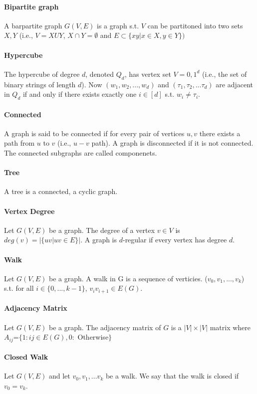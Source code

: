 \documentclass{article}
\begin{document}
\paragraph{Bipartite graph} A barpartite graph $G(V,E)$ is a graph s.t. $V$ can be partitoned into two sets $X, Y$ (i.e., $V=XUY$, $X\cap Y= \emptyset$ and $E\subset \{xy|x\in X, y \in  Y\})$
\paragraph{Hypercube} The hypercube of degree $d$, denoted $Q_d$, has vertex set $V = {0,1}^d$ (i.e., the set of binary strings of length $d$). Now $(w_1, w_2, ..., w_d)$ and $(\tau_1, \tau_2,...\tau_d)$ are adjacent in $Q_d$ if and only if there exists exactly one $i \in [d]$ s.t. $w_i \neq \tau_i$.
\paragraph{Connected} A graph is said to be connected if for every pair of vertices $u,v$ there exists a path from $u$ to $v$ (i.e., $u-v$ path). A graph is disconnected if it is not connected. The connected subgraphs are called componenets.
\paragraph{Tree} A tree is a connected, a cyclic graph.
\paragraph{Vertex Degree}Let $G(V, E)$ be a graph. The degree of a vertex $v \in V$ is $deg(v)= |\{uv|uv\in E\}|$. A graph is $d$-regular if every vertex has degree $d$.
\paragraph{Walk}Let $G(V,E)$ be a graph. A walk in G is a sequence of verticies. ($v_0, v_1,...,v_k$) s.t. for all $i \in \{0,...,k-1\}$, $v_iv_{i+1} \in E(G)$.
\paragraph{Adjacency Matrix}Let $G(V,E)$ be a graph. The adjacency matrix of $G$ is a $|V| \times |V|$ matrix where $A_{ij}$=$\{1:ij\in E(G), 0:$ Otherwise$\}$
\paragraph{Closed Walk}Let $G(V, E)$ and let $v_0, v_1,...v_k$ be a walk. We say that the walk is closed if $v_0 = v_k$.
\end{document}
